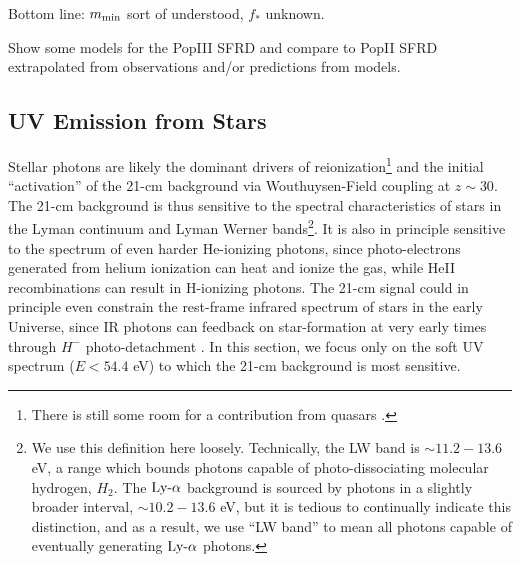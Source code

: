 {\color{red} Bottom line: $m_{\text{min}}$ sort of understood, $f_{\ast}$ unknown.}

{\color{red} Show some models for the PopIII SFRD and compare to PopII SFRD extrapolated from observations and/or predictions from models.}




\subsection{UV Emission from Stars} \label{sec:UV}
Stellar photons are likely the dominant drivers of reionization\footnote{There is still some room for a contribution from quasars \cite[see, e.g.,][]{Madau2018}.} and the initial ``activation'' of the 21-cm background via Wouthuysen-Field coupling at $z \sim 30$. The 21-cm background is thus sensitive to the spectral characteristics of stars in the Lyman continuum and Lyman Werner bands\footnote{We use this definition here loosely. Technically, the LW band is $\sim 11.2-13.6$ eV, a range which bounds photons capable of photo-dissociating molecular hydrogen, $H_2$. The $\text{Ly-}\alpha$ background is sourced by photons in a slightly broader interval, $\sim 10.2-13.6$ eV, but it is tedious to continually indicate this distinction, and as a result, we use ``LW band'' to mean all photons capable of eventually generating $\text{Ly-}\alpha$ photons.}. It is also in principle sensitive to the spectrum of even harder He-ionizing photons, since photo-electrons generated from helium ionization can heat and ionize the gas, while HeII recombinations can result in H-ionizing photons. The 21-cm signal could in principle even constrain the rest-frame infrared spectrum of stars in the early Universe, since IR photons can feedback on star-formation at very early times through $H^-$ photo-detachment \cite{WolcottGreen2012}. In this section, we focus only on the soft UV spectrum ($E < 54.4$ eV) to which the 21-cm background is most sensitive.

